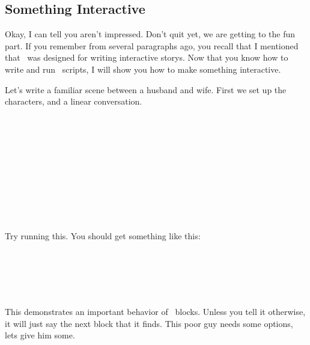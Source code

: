 \documentclass{book}
\begin{document}
\subsection{Something Interactive}

Okay, I can tell you aren't impressed. Don't quit yet, we are getting to the fun part.  If you remember from several paragraphs ago, you recall that I mentioned that \SSquared\ was designed for writing interactive storys.  Now that you know how to write and run \SSquared\ scripts, I will show you how to make something interactive.

Let's write a familiar scene between a husband and wife.  First we set up the characters, and a linear conversation.

\begin{SSCodeBox}
 \\
 \\
\scitea{} \\
\scitea{\{} \\
\scitea{\hspace*{4em}}
\scitea{;} \\
\scitea{\}} \\
\scitea{} \\
\scitea{\{} \\
\scitea{\hspace*{4em}}
\scitea{;} \\
\scitea{\}}
\end{SSCodeBox}
Try running this.  You should get something like this:

\begin{SSCodeBox}
 \\
 \\
\scitea{} \\
 \\
\end{SSCodeBox}

This demonstrates an important behavior of \SSquared\ blocks. Unless you tell it otherwise, it will just say the next block that it finds.  This poor guy needs some options, lets give him some.
\end{document}
